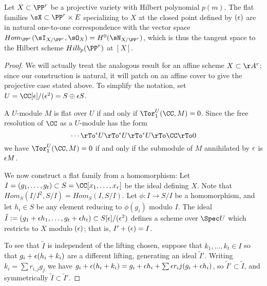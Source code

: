 \begin{theorem}\label{tangent space of Hilb}
Let $X\subset \PP^r$ be a projective variety with Hilbert polynomial $p(m)$. The flat families 
$\sX \subset \PP^r\times E$ specializing to $X$ at the closed point defined by $(\eps)$
are in natural one-to-one correspondence with the vector space $Hom_{\PP^r}(\sI_{X/\PP^r}, \sO_X) = H^0(\sN_{X/\PP^r})$, which is thus the tangent space to the Hilbert scheme $Hilb_{p}(\PP^r)$ at $[X]$.
\end{theorem}

\begin{proof}
We will actually treat the analogous result for an affine scheme $X \subset \AA^r$; since our construction is natural, it will patch on an affine cover to give the projective case stated above. To simplify the notation, set $U = \CC[\eps]/(\eps^2)= S \oplus \eps S$. 

A $U$-module $M$ is flat  over $U$ if and only if $\Tor_1^U(\CC,M) = 0$. 
Since the free resolution of $\CC$ as a $U$-module has the form
$$
\cdots \rTo^\eps U \rTo^\eps U \rTo^\eps U \rTo \CC \rTo 0
$$
we have $\Tor_1^U(\CC,M)=0$ if and only if the submodule of $M$ annihilated by $\eps$ is $\eps M$.


We now construct a flat family from a homomorphism: Let $I = (g_1,\dots, g_t)\subset S = \CC[x_1,\dots, x_r]$ be the ideal defining $X$. 
Note that $Hom_S(I/I^2, S/I) = Hom_S(I,S/I)$. Let $\phi: I\to S/I$ be a homomorphism, and let $h_i\in S$ be
any element reducing to $\phi(g_i)$ modulo $I$.  The ideal
$\tilde I := (g_1+\eps h_1,\dots, g_t+\eps h_t)\subset S[\eps]/(\eps^2)$
defines a scheme over $\Spec U$ which restricts to $X$ modulo $(\eps)$; that is, $I' +(\eps) = I$. 

To see that $\tilde I$ is 
independent of the lifting chosen, suppose that $k_1,\dots,k_t\in I$ so that $g_i+\eps(h_i+k_i)$ are a different lifting,
generating an ideal $\tilde I'$.
Writing $k_i = \sum r_{i,j}g_j$ we have $g_i+\eps(h_i+k_i) = g_i+\eps h_i+ \sum \eps r_ij(g_i+\eps h_i)$, so 
$\tilde I' \subset \tilde I$, and symmetrically $\tilde I \subset \tilde I'$.


\end{proof}
